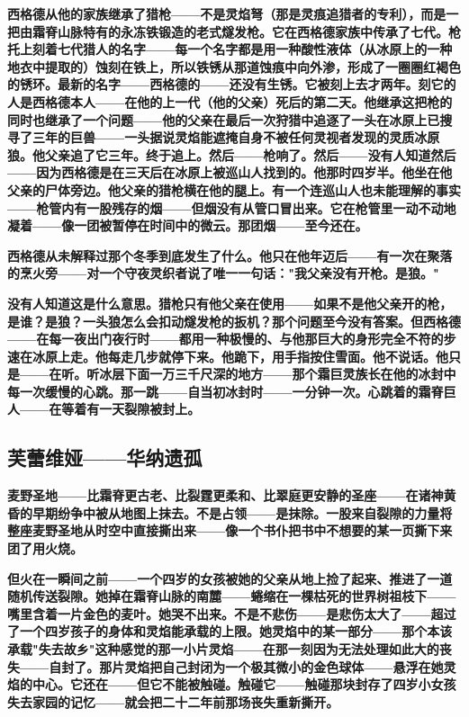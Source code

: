 \documentclass[12pt,a4paper,openany]{ctexbook}
\begin{document}
\textbf{西格德从他的家族继承了猎枪——不是灵焰弩（那是灵痕追猎者的专利），而是一把由霜脊山脉特有的永冻铁锻造的老式燧发枪。它在西格德家族中传承了七代。枪托上刻着七代猎人的名字——每一个名字都是用一种酸性液体（从冰原上的一种地衣中提取的）蚀刻在铁上，所以铁锈从那道蚀痕中向外渗，形成了一圈圈红褐色的锈环。最新的名字——西格德的——还没有生锈。它被刻上去才两年。刻它的人是西格德本人——在他的上一代（他的父亲）死后的第二天。他继承这把枪的同时也继承了一个问题——他的父亲在最后一次狩猎中追逐了一头在冰原上已搜寻了三年的巨兽——一头据说灵焰能遮掩自身不被任何灵视者发现的灵质冰原狼。他父亲追了它三年。终于追上。然后——枪响了。然后——没有人知道然后——因为西格德是在三天后在冰原上被巡山人找到的。他那时四岁半。他坐在他父亲的尸体旁边。他父亲的猎枪横在他的腿上。有一个连巡山人也未能理解的事实——枪管内有一股残存的烟——但烟没有从管口冒出来。它在枪管里一动不动地凝着——像一团被暂停在时间中的微云。那团烟——至今还在。}


\textbf{西格德从未解释过那个冬季到底发生了什么。他只在他年迈后——有一次在聚落的烹火旁——对一个守夜灵织者说了唯一一句话："我父亲没有开枪。是狼。"}


\textbf{没有人知道这是什么意思。猎枪只有他父亲在使用——如果不是他父亲开的枪，是谁？是狼？一头狼怎么会扣动燧发枪的扳机？那个问题至今没有答案。但西格德——在每一夜出门夜行时——都用一种极慢的、与他那巨大的身形完全不符的步速在冰原上走。他每走几步就停下来。他跪下，用手指按住雪面。他不说话。他只是——在听。听冰层下面一万三千尺深的地方——那个霜巨灵族长在他的冰封中每一次缓慢的心跳。那一跳——自当初冰封时——一分钟一次。心跳着的霜脊巨人——在等着有一天裂隙被封上。}


\subsection*{芙蕾维娅——华纳遗孤}


\textbf{麦野圣地——比霜脊更古老、比裂霆更柔和、比翠庭更安静的圣座——在诸神黄昏的早期纷争中被从地图上抹去。不是占领——是抹除。一股来自裂隙的力量将整座麦野圣地从时空中直接撕出来——像一个书仆把书中不想要的某一页撕下来团了用火烧。}


\textbf{但火在一瞬间之前——一个四岁的女孩被她的父亲从地上捡了起来、推进了一道随机传送裂隙。她掉在霜脊山脉的南麓——蜷缩在一棵枯死的世界树祖枝下——嘴里含着一片金色的麦叶。她哭不出来。不是不悲伤——是悲伤太大了——超过了一个四岁孩子的身体和灵焰能承载的上限。她灵焰中的某一部分——那个本该承载"失去故乡"这种感觉的那一小片灵焰——在那一刻因为无法处理如此大的丧失——自封了。那片灵焰把自己封闭为一个极其微小的金色球体——悬浮在她灵焰的中心。它还在——但它不能被触碰。触碰它——触碰那块封存了四岁小女孩失去家园的记忆——就会把二十二年前那场丧失重新撕开。}
\end{document}

